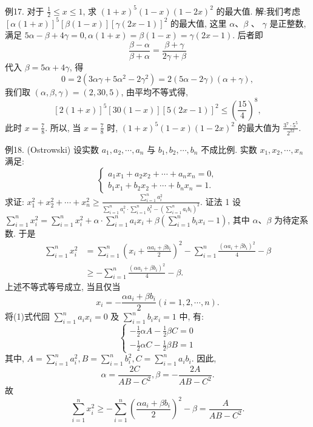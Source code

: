 例17. 对于 $\frac{1}{2} \leqslant x \leqslant 1$, 求 $(1+x)^5(1-x)(1-2 x)^2$ 的最大值.
解:我们考虑 $[\alpha(1+x)]^5[\beta(1-x)][\gamma(2 x-1)]^2$ 的最大值, 这里 $\alpha 、 \beta$ 、 $\gamma$ 是正整数, 满足 $5 \alpha-\beta+4 \gamma=0, \alpha(1+x)=\beta(1-x)=\gamma(2 x-1)$. 后者即
$$
\frac{\beta-\alpha}{\beta+\alpha}=\frac{\beta+\gamma}{2 \gamma+\beta}
$$
代入 $\beta=5 \alpha+4 \gamma$, 得
$$
0=2\left(3 \alpha \gamma+5 \alpha^2-2 \gamma^2\right)=2(5 \alpha-2 \gamma)(\alpha+\gamma),
$$
我们取 $(\alpha, \beta, \gamma)=(2,30,5)$, 由平均不等式得,
$$
[2(1+x)]^5[30(1-x)][5(2 x-1)]^2 \leqslant\left(\frac{15}{4}\right)^8,
$$
此时 $x=\frac{7}{8}$. 所以, 当 $x=\frac{7}{8}$ 时, $(1+x)^5(1-x)(1-2 x)^2$ 的最大值为 $\frac{3^7 \cdot 5^5}{2^{22}}$.



例18. (Ostrowski) 设实数 $a_1, a_2, \cdots, a_n$ 与 $b_1, b_2, \cdots, b_n$ 不成比例.
实数 $x_1, x_2, \cdots, x_n$ 满足:
$$
\left\{\begin{array}{l}
a_1 x_1+a_2 x_2+\cdots+a_n x_n=0, \\
b_1 x_1+b_2 x_2+\cdots+b_n x_n=1 .
\end{array}\right.
$$
求证: $x_1^2+x_2^2+\cdots+x_n^2 \geqslant \frac{\sum_{i=1}^n a_i^2}{\sum_{i=1}^n a_i^2 \cdot \sum_{i=1}^n b_i^2-\left(\sum_{i=1}^n a_i b_i\right)^2}$.
证法 1 设 $\sum_{i=1}^n x_i^2=\sum_{i=1}^n x_i^2+\alpha \cdot \sum_{i=1}^n a_i x_i+\beta\left(\sum_{i=1}^n b_i x_i-1\right)$,
其中 $\alpha 、 \beta$ 为待定系数.
于是
$$
\begin{aligned}
\sum_{i=1}^n x_i^2 & =\sum_{i=1}^n\left(x_i+\frac{\alpha a_i+\beta b_i}{2}\right)^2-\sum_{i=1}^n \frac{\left(\alpha a_i+\beta b_i\right)^2}{4}-\beta \\
& \geqslant-\sum_{i=1}^n \frac{\left(\alpha a_i+\beta b_i\right)^2}{4}-\beta .
\end{aligned}
$$
上述不等式等号成立, 当且仅当
$$
x_i=-\frac{\alpha a_i+\beta b_i}{2}(i=1,2, \cdots, n) . \label{(1)}
$$
将(1)式代回 $\sum_{i=1}^n a_i x_i=0$ 及 $\sum_{i=1}^n b_i x_i=1$ 中, 有:
$$
\left\{\begin{array}{l}
-\frac{1}{2} \alpha A-\frac{1}{2} \beta C=0 \\
-\frac{1}{2} \alpha C-\frac{1}{2} \beta B=1
\end{array}\right.
$$
其中, $A=\sum_{i=1}^n a_i^2, B=\sum_{i=1}^n b_i^2, C=\sum_{i=1}^n a_i b_i$. 因此,
$$
\alpha=\frac{2 C}{A B-C^2}, \beta=-\frac{2 A}{A B-C^2} .
$$
故
$$
\sum_{i=1}^n x_i^2 \geqslant-\sum_{i=1}^n\left(\frac{\alpha a_i+\beta b_i}{2}\right)^2-\beta=\frac{A}{A B-C^2} .
$$



